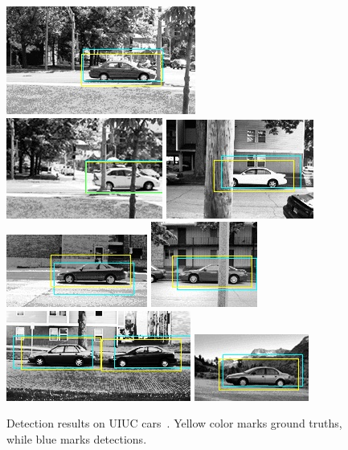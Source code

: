 \begin{figure}[H]
\includegraphics[scale=0.75]{test-22_good.jpg}
\includegraphics[scale=0.75]{test-24_good.jpg}
\includegraphics[scale=0.75]{test-29_good.jpg}
\includegraphics[scale=0.75]{test-2_good.jpg}
\includegraphics[scale=0.75]{test-31_good.jpg}
\includegraphics[scale=0.75]{test-3_good.jpg}
\includegraphics[scale=0.75]{test-5_good.jpg}


\caption[Detection results on UIUC cars]{Detection results on UIUC cars~\citep{cds}. Yellow color marks ground truths, while blue marks detections.}
\label{fig:c5r}
\end{figure}

